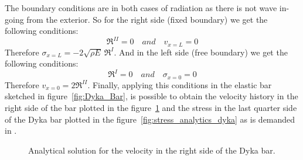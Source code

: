 The boundary conditions are in both cases of radiation as there is not
wave in-going from the exterior. So for the right side (fixed
boundary) we get the following conditions:
\begin{equation*}
  \Re^{II} = 0 \quad and \quad v_{x=L} = 0
\end{equation*}
Therefore $\sigma_{x=L} = -2\sqrt{\rho E}\ \Re^{I}$. And in the left side
(free boundary) we get the following conditions:
\begin{equation*}
  \Re^{I} = 0 \quad and \quad \sigma_{x=0} = 0
\end{equation*}
Therefore $v_{x=0} = 2\Re^{II}$. Finally, applying this conditions in
the elastic bar sketched in figure~\ref{fig:Dyka_Bar}, is possible to obtain
the velocity history in the right side of the bar plotted in the figure~\ref{fig:vel_analytics_dyka} and the stress in the last quarter side of the Dyka
bar plotted in the figure~\ref{fig:stress_analytics_dyka} as is demanded in \cite{Dyka1995}.

\begin{figure}\sidecaption
  \centering
  \caption[Velocities values in the right side of the Dyka
  bar]{Analytical solution for the velocity in the right side of the Dyka bar.}
  \label{fig:vel_analytics_dyka}
\end{figure}

